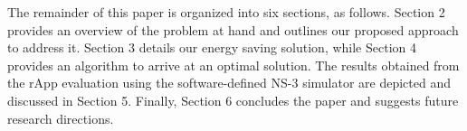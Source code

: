 The remainder of this paper is organized into six sections, as follows.
Section 2 provides an overview of the problem at hand and outlines our proposed approach to address it.
Section 3 details our energy saving solution, while Section 4 provides an algorithm to arrive at an optimal solution.
The results obtained from the rApp evaluation using the software-defined NS-3 simulator are depicted and discussed in Section 5. 
Finally, Section 6 concludes the paper and suggests future research directions.

